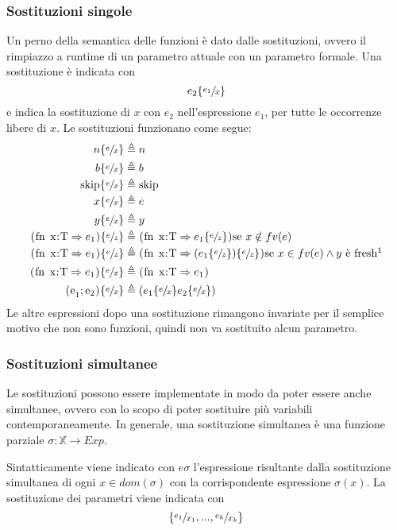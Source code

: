 \documentclass[a4paper, 11pt]{article}
\newcommand{\code}[1]{\textup{\lstinline|#1|}}
\newcommand{\subs}[3]{#1 \lbrace \sfrac{#2}{#3} \rbrace}
\begin{document}
\subsubsection{Sostituzioni singole}
Un perno della semantica delle funzioni è dato dalle sostituzioni, ovvero il rimpiazzo a runtime di un parametro attuale con un parametro formale. Una sostituzione è indicata con \[ \subs{e_2}{e_1}{x}  \] e indica la sostituzione di $x$  con $e_2$ nell'espressione $e_1$, per tutte le occorrenze libere di $x$. Le sostituzioni funzionano come segue: \begin{align*}
	\subs{n}{e}{x} &\triangleq n \\
	\subs{b}{e}{x} &\triangleq b \\
	\subs{\code{skip}}{e}{x} &\triangleq \code{skip} \\
	\subs{x}{e}{x} &\triangleq e \\
	\subs{y}{e}{x} &\triangleq y \\
	\subs{\code{(fn x:T} \Rightarrow e_1 \code{)}}{e}{z} &\triangleq \code{(fn x:T} \Rightarrow \subs{e_1}{e}{z}\code{)} \text{se } x \notin fv(e) \\
	\subs{\code{(fn x:T} \Rightarrow e_1 \code{)}}{e}{z} &\triangleq \code{(fn x:T} \Rightarrow (\subs{e_1}{e}{z})\lbrace \sfrac{e}{z} \rbrace \code{)} \text{se } x \in fv(e) \wedge y \text{ è fresh}\footnotemark \\
	\subs{\code{(fn x:T} \Rightarrow e_1 \code{)}}{e}{x} &\triangleq \code{(fn x:T} \Rightarrow e_1 \code{)} \\
	\subs{\code{(e}_1; \code{e}_2 \code{)}}{e}{x} &\triangleq (\subs{e_1}{e}{x}\subs{e_2}{e}{x})
\end{align*}
Le altre espressioni dopo una sostituzione rimangono invariate per il semplice motivo che non sono funzioni, quindi non va sostituito alcun parametro.

\subsubsection{Sostituzioni simultanee}
Le sostituzioni possono essere implementate in modo da poter essere anche simultanee, ovvero con lo scopo di poter sostituire più variabili contemporaneamente. In generale, una sostituzione simultanea è una funzione parziale $\sigma: \mathbb{X} \to Exp$.

Sintatticamente viene indicato con $e \sigma$ l'espressione risultante dalla sostituzione simultanea di ogni $x \in dom(\sigma)$ con la corrispondente espressione $\sigma(x)$. La sostituzione dei parametri viene indicata con \[ \lbrace \sfrac{e_1}{x_1}, ..., \sfrac{e_k}{x_k} \rbrace \]
\end{document}
